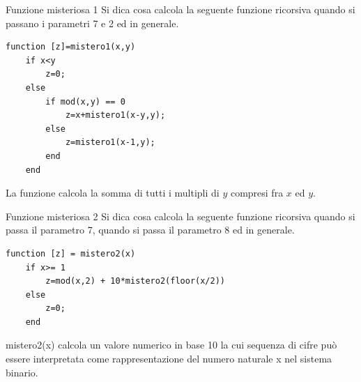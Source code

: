 \documentclass[format=169, handout]{beamer}
\begin{document}
\begin{frame}[fragile]{Funzione misteriosa 1}
	Si dica cosa calcola la seguente funzione ricorsiva quando si passano i parametri 7 e 2 ed in generale.
	
\begin{lstlisting}[style=matlab]
function [z]=mistero1(x,y)
    if x<y
        z=0;
    else
        if mod(x,y) == 0
            z=x+mistero1(x-y,y);
        else
            z=mistero1(x-1,y);
        end
    end
\end{lstlisting}
	
	\pause
	La funzione calcola la somma di tutti i multipli di $y$ compresi fra $x$ ed $y$.
\end{frame}

\begin{frame}[fragile]{Funzione misteriosa 2}
	Si dica cosa calcola la seguente funzione ricorsiva quando si passa il parametro 7, quando si passa il parametro 8 ed in generale.
	
\begin{lstlisting}[style=matlab]
function [z] = mistero2(x)
    if x>= 1
        z=mod(x,2) + 10*mistero2(floor(x/2))
    else
        z=0;
    end
\end{lstlisting}

\pause
mistero2(x) calcola un valore numerico in base 10 la cui sequenza di cifre può essere
interpretata come rappresentazione del numero naturale x nel sistema binario.
\end{frame}
\end{document}
